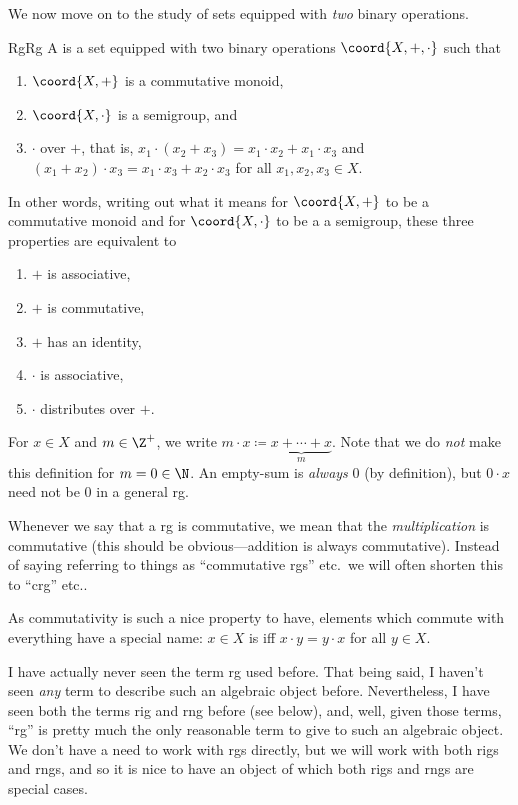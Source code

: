 We now move on to the study of sets equipped with \emph{two} binary operations.
\begin{dfn}{Rg}{Rg}
A  is a set equipped with two binary operations $\coord{X,+,\cdot}$ such that
\begin{enumerate}
\item $\coord{X,+}$ is a commutative monoid,
\item $\coord{X,\cdot}$ is a semigroup, and
\item $\cdot$  over $+$, that is, $x_1\cdot (x_2+x_3)=x_1\cdot x_2+x_1\cdot x_3$ and $(x_1+x_2)\cdot x_3=x_1\cdot x_3+x_2\cdot x_3$ for all $x_1,x_2,x_3\in X$.
\end{enumerate}
\begin{rmk}
In other words, writing out what it means for $\coord{X,+}$ to be a commutative monoid and for $\coord{X,\cdot}$ to be a a semigroup, these three properties are equivalent to
\begin{enumerate}
\item $+$ is associative,
\item $+$ is commutative,
\item $+$ has an identity,
\item $\cdot$ is associative,
\item $\cdot$ distributes over $+$.
\end{enumerate}
\end{rmk}
\begin{rmk}
For $x\in X$ and $m\in \Z ^+$, we write $m\cdot x\coloneqq \underbrace{x+\cdots +x}_{m}$.  Note that we do \emph{not} make this definition for $m=0\in \N$.  An empty-sum is \emph{always} $0$ (by definition), but $0\cdot x$ need not be $0$ in a general rg.
\end{rmk}
\begin{rmk}
Whenever we say that a rg is commutative, we mean that the \emph{multiplication} is commutative (this should be obvious---addition is always commutative).  Instead of saying referring to things as ``commutative rgs'' etc.~we will often shorten this to ``crg'' etc..

As commutativity is such a nice property to have, elements which commute with everything have a special name:  $x\in X$ is  iff $x\cdot y=y\cdot x$ for all $y\in X$.
\end{rmk}
\begin{rmk}
I have actually never seen the term rg used before.  That being said, I haven't seen \emph{any} term to describe such an algebraic object before.  Nevertheless, I have seen both the terms rig and rng before (see below), and, well, given those terms, ``rg'' is pretty much the only reasonable term to give to such an algebraic object.  We don't have a need to work with rgs directly, but we will work with both rigs and rngs, and so it is nice to have an object of which both rigs and rngs are special cases.
\end{rmk}
\end{dfn}
